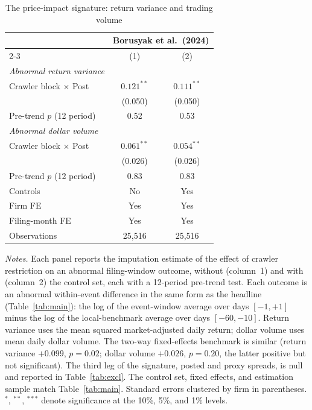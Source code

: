 \begin{table}[t]
\centering
\begin{threeparttable}
\caption{The price-impact signature: return variance and trading volume}
\label{tab:signature}
\small
\begin{tabular}{lcc}
\toprule
 & \multicolumn{2}{c}{Borusyak et al.\ (2024)} \\
\cmidrule(lr){2-3}
 & (1) & (2) \\
\midrule
\textit{Abnormal return variance} & & \\
\quad Crawler block $\times$ Post & $0.121^{**}$ & $0.111^{**}$ \\
                                  & (0.050)      & (0.050) \\
\quad Pre-trend $p$ (12 period)   & 0.52         & 0.53 \\[4pt]
\textit{Abnormal dollar volume}   & & \\
\quad Crawler block $\times$ Post & $0.061^{**}$ & $0.054^{**}$ \\
                                  & (0.026)      & (0.026) \\
\quad Pre-trend $p$ (12 period)   & 0.83         & 0.83 \\
\midrule
Controls         & No       & Yes \\
Firm FE          & Yes      & Yes \\
Filing-month FE  & Yes      & Yes \\
Observations     & 25{,}516 & 25{,}516 \\
\bottomrule
\end{tabular}
\begin{tablenotes}\footnotesize
\item \textit{Notes.} Each panel reports the \citet{BorusyakJaravelSpiess2024} imputation estimate of the effect of crawler restriction on an abnormal filing-window outcome, without (column~1) and with (column~2) the control set, each with a 12-period pre-trend test. Each outcome is an abnormal within-event difference in the same form as the headline (Table~\ref{tab:main}): the log of the event-window average over days $[-1,+1]$ minus the log of the local-benchmark average over days $[-60,-10]$. Return variance uses the mean squared market-adjusted daily return; dollar volume uses mean daily dollar volume. The two-way fixed-effects benchmark is similar (return variance $+0.099$, $p=0.02$; dollar volume $+0.026$, $p=0.20$, the latter positive but not significant). The third leg of the signature, posted and proxy spreads, is null and reported in Table~\ref{tab:excl}. The control set, fixed effects, and estimation sample match Table~\ref{tab:main}. Standard errors clustered by firm in parentheses. $^{*}$, $^{**}$, $^{***}$ denote significance at the 10\%, 5\%, and 1\% levels.
\end{tablenotes}
\end{threeparttable}
\end{table}
